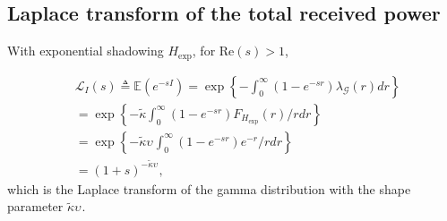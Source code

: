\documentclass[lettersize,journal]{IEEEtran}
\begin{document}



\subsection{Laplace transform of the total received power}

With exponential shadowing ${H}_{\text{exp}}$, for Re$(s)>1$,

\begin{align}
  \label{eq:lapdef}
  &\mathcal{L}_{I}(s)\triangleq \mathbb{E}\left(e^{-sI}\right)= \exp\left\{-\int_0^{\infty}(1-e^{-sr}) \lambda_{\mathcal{G}}(r) dr \right\} \nonumber \\
  &=\exp\left\{-\tilde{\kappa}\int_0^{\infty}(1-e^{-sr}) F_{{H}_{\text{exp}}}(r) /r dr \right\} \nonumber \\
  &=\exp\left\{-\tilde{\kappa}\upsilon_{}\int_0^{\infty}(1-e^{-sr}) e^{-r} /r dr \right\} \nonumber \\
  &=(1+s)^{-\tilde{\kappa}\upsilon_{}},
\end{align}
which is the Laplace transform of the gamma distribution with the shape parameter $\tilde{\kappa}\upsilon_{}$. 
\end{document}
